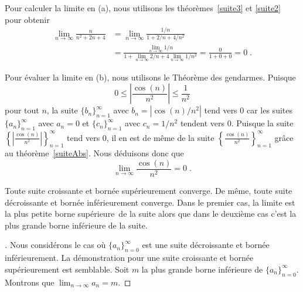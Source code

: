 {\begin{egg}
Pour calculer la limite en (a), nous utilisons les
théorèmes~\ref{suite3} et \ref{suite2} pour obtenir
\begin{align*}
\lim_{n\rightarrow \infty} \frac{n}{n^2+2n+4}
&= \lim_{n\rightarrow \infty} \frac{1/n}{1+2/n+4/n^2} \\
&= \frac{\displaystyle \lim_{n\rightarrow \infty} 1/n}
{\displaystyle 1 + \lim_{n\rightarrow \infty} 2/n
+ 4 \lim_{n\rightarrow \infty} 1/n^2} = \frac{0}{1+0+0} = 0 \; .
\end{align*}

Pour évaluer la limite en (b), nous utilisons le
Théorème des gendarmes.  Puisque
\[
0 \leq \left| \frac{\cos(n)}{n^2} \right| \leq \frac{1}{n^2}
\]
pour tout $n$, la suite $\{b_n\}_{n=1}^\infty$ avec $b_n = |\cos(n)/n^2|$
tend vers $0$ car les suites $\{a_n\}_{n=1}^\infty$ avec $a_n = 0$ et
$\{c_n\}_{n=1}^\infty$ avec $c_n = 1/n^2$ tendent vers $0$.  Puisque la
suite
$\displaystyle \left\{ \left| \frac{\cos(n)}{n^2} \right|\right\}_{n=1}^\infty$
tend vers $0$, il en est de même de la suite 
$\displaystyle \left\{\frac{\cos(n)}{n^2}\right\}_{n=1}^\infty$ grâce
au théorème~\ref{suiteAbs}.  Nous déduisons donc que
\[
\lim_{n\rightarrow \infty} \frac{\cos(n)}{n^2} = 0 \; .
\]
\end{egg}

\begin{focus}[\theory]{\thm}
Toute suite croissante et bornée supérieurement converge.  De même,
toute suite décroissante et bornée inférieurement converge.  Dans le
premier cas, la limite est la plus petite borne
supérieure\footnotemark\ de la suite alors que dans le deuxième cas
c'est la plus grande borne inférieure de la suite.
\label{suiteBORN}
\end{focus}


\begin{proof}[\theory]
Nous considérons le cas où $\displaystyle \{ a_n \}_{n=0}^\infty$ est une
suite décroissante et bornée inférieurement.  La démonstration pour
une suite croissante et bornée supérieurement est semblable.  Soit $m$
la plus grande borne inférieure de
$\displaystyle \{ a_n \}_{n=0}^\infty$.  Montrons que
$\displaystyle \lim_{n\to \infty} a_n = m$.


\end{proof}}
